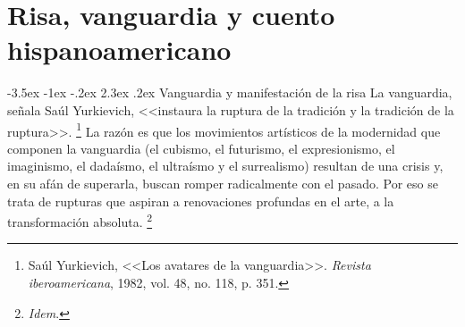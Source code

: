 \documentclass[14pt,twoside,final]{extbook} %
\makeatletter
\let\oldfootnote\footnote
\renewcommand\footnote[1]{%
\oldfootnote{\hspace{1mm}#1}}
\renewcommand\section{\@startsection {section}{1}{\z@}%
                                     {-3.5ex \@plus -1ex \@minus -.2ex}%
                                     {2.3ex \@plus .2ex}%
                                     {\normalfont\large\bfseries\sc}}
\makeatother
\begin{document}
\chapter{Risa, vanguardia y cuento hispanoamericano}\label{ch:risa-vanguardia-y-cuento-hispanoamericano}
\BgThispage
\thispagestyle{empty}
\pagestyle{fancy}
\fancyhf{} %
\fancyhead[RO,LE]{\thepage}
\renewcommand{\headrulewidth}{0pt}
\setcounter{page}{25}
\section{Vanguardia y manifestación de la risa}\label{sec:vanguardia-y-manifestacion-de-la-risa}
La vanguardia, señala Saúl Yurkievich, <<instaura la ruptura de la tradición y la
tradición de la ruptura>>.\footnote{Saúl Yurkievich, <<Los avatares de la vanguardia>>. \emph{Revista iberoamericana}, 1982, vol. 48, no. 118, p. 351.} La razón es que los movimientos artísticos de la modernidad que componen la vanguardia (el cubismo, el futurismo, el expresionismo, el imaginismo, el dadaísmo, el ultraísmo y el surrealismo) resultan de una crisis y, en su afán de superarla, buscan romper radicalmente con el pasado. Por eso se trata de rupturas que aspiran a renovaciones profundas en el arte, a la transformación absoluta.\footnote{\emph{Idem}.}
\end{document}
